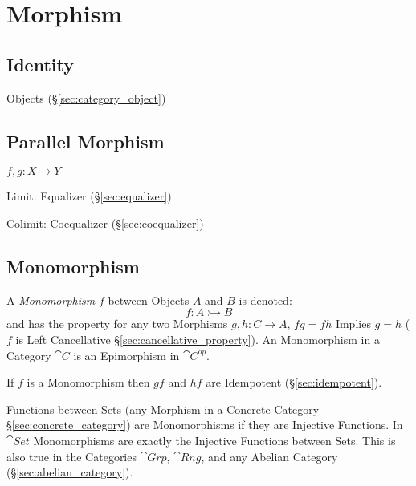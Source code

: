 \section{Morphism}\label{sec:morphism}

\subsection{Identity}\label{sec:identity_morphism}

Objects (\S\ref{sec:category_object})



\subsection{Parallel Morphism}\label{sec:parallel_morphism}

$f,g : X \rightarrow Y$

Limit: Equalizer (\S\ref{sec:equalizer})

Colimit: Coequalizer (\S\ref{sec:coequalizer})



\subsection{Monomorphism}\label{sec:monomorphism}

A \emph{Monomorphism} $f$ between Objects $A$ and $B$ is denoted:
\[
  f : A \rightarrowtail B
\]
and has the property for any two Morphisms $g, h : C \rightarrow A$,
$fg = fh$ Implies $g = h$ ($f$ is Left Cancellative
\S\ref{sec:cancellative_property}). An Monomorphism in a Category
$\cat{C}$ is an Epimorphism in $\cat{C^{op}}$.

If $f$ is a Monomorphism then $gf$ and $hf$ are Idempotent
(\S\ref{sec:idempotent}). %

Functions between Sets (any Morphism in a Concrete Category
\S\ref{sec:concrete_category}) are Monomorphisms if they are Injective
Functions. In $\cat{Set}$ Monomorphisms are exactly the Injective
Functions between Sets. This is also true in the Categories
$\cat{Grp}$, $\cat{Rng}$, and any Abelian Category
(\S\ref{sec:abelian_category}).

